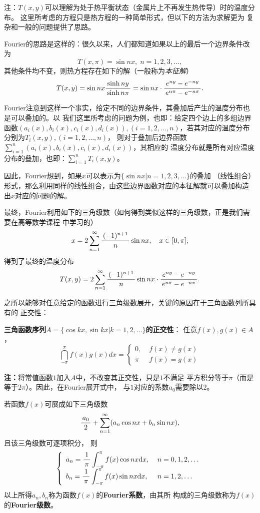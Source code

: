 \begin{shaded}
	注：$T(x,y)$可以理解为处于热平衡状态（金属片上不再发生热传导）时的温度分布。
	这里所考虑的方程只是热方程的一种简单形式，但以下的方法为求解更为
	复杂和一般的问题提供了思路。
	
	Fourier的思路是这样的：很久以来，人们都知道如果以上的最后一个边界条件改为
	$$T(x,\pi)=\sin nx,\;n=1,2,3,\ldots,$$
	其他条件均不变，则热方程存在如下的解（一般称为{\it 本征解}）
	$$T(x,y)=\sin nx\displaystyle\frac{\,{\sinh ny}\,}{\,{\sinh n\pi}\,}
	=\sin nx\cdot\displaystyle\frac{\,{e^{ny}-e^{-ny}}\,}{\,{e^{n\pi}-e^{-n\pi}}\,}.$$
	
	Fourier注意到这样一个事实，给定不同的边界条件，其叠加后产生的温度分布也是可以叠加的。以
	我们这里所考虑的问题为例，也即：给定四个边上的多组边界函数$(a_i(x),b_i(x),c_i(x),
	d_i(x)),(i=1,2,\ldots,n)$，若其对应的温度分布分别为$T_i(x,y),(i=1,2,\ldots,n)$，
	则对于叠加后边界函数$\sum\limits_{i=1}^n(a_i(x),b_i(x),c_i(x),d_i(x))$，其相应的
	温度分布就是所有对应温度分布的叠加，也即：$\sum\limits_{i=1}^nT_i(x,y)$。
	
	因此，Fourier想到，如果$x$可以表示为$\{\sin nx|n=1,2,3,\ldots\}$的叠加
	（线性组合）形式，那么利用同样的线性组合，由这些边界函数对应的本征解就可以叠加构造
	出$x$对应的问题的解。
	
	最终，Fourier利用如下的三角级数（如何得到类似这样的三角级数，正是我们需要在高等数学课程
	中学习的）
	$$x=2\sum\limits_{n=1}^{\infty}\displaystyle\frac{\,{(-1)^{n+1}}\,}{\,{n}\,}\sin{nx},\quad x\in[0,\pi],$$
	得到了最终的温度分布
	$$T(x,y)=2\sum\limits_{n=1}^{\infty}\displaystyle\frac{\,{(-1)^{n+1}}\,}{\,{n}\,}\sin{nx}
	\cdot\displaystyle\frac{\,{e^{ny}-e^{-ny}}\,}{\,{e^{n\pi}-e^{-n\pi}}\,}.$$
\end{shaded}
 
之所以能够对任意给定的函数进行三角级数展开，关键的原因在于三角函数列所具有的
{\kaishu 正交性}：

\begin{thx}
	{\bf 三角函数序列$A=\{\cos kx,\sin kx|k=1,2,\ldots\}$的正交性}：
	任意$f(x),g(x)\in A$，
	$$\dint_{-\pi}^{\pi}f(x)g(x)dx=\left\{\begin{array}{ll}
	0,\;& f(x)\ne g(x)\\ \pi\;& f(x)=g(x)
	\end{array}\right.$$
\end{thx}

{\bf 注：}将常值函数$1$加入$A$中，不改变其正交性，只是$1$不满足
平方积分等于$\pi$（而是等于$2\pi$）。因此，在Fourier展开式中，
与$1$对应的系数$a_0$需要除以$2$。

\begin{thx}
	若函数$f(x)$可展成如下三角级数
	$$\displaystyle\frac{\,{a_0}\,}{\,{2}\,}+\sum\limits_{n=1}^{\infty}(a_n\cos nx+b_n\sin nx),$$
	且该三角级数可逐项积分， 则
	$$\left\{\begin{array}{ll}
	a_n=\displaystyle\frac{\,{1}\,}{\,{\pi}\,}\displaystyle\int_{-\pi}^{\pi}f(x)\cos nx\mathrm{d} x,\;& n=0,1,2,\ldots\\[5pt]
	b_n=\displaystyle\frac{\,{1}\,}{\,{\pi}\,}\displaystyle\int_{-\pi}^{\pi}f(x)\sin nx\mathrm{d} x,\;& n=1,2,\ldots
	\end{array}\right.$$
	以上所得$a_n,b_n$称为函数$f(x)$的{\bf Fourier系数}，由其所
	构成的三角级数称为$f(x)$的{\bf Fourier级数}。
\end{thx}


